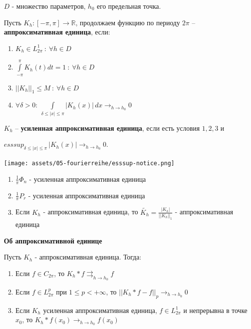 \begin{definition}
    $D$ - множество параметров, $h_0$ его предельная точка.

    Пусть $K_h: [-\pi, \pi] \to \mathbb{R}$, продолжаем функцию по периоду $2\pi$ -- \textbf{аппроксимативная единица}, если:

    \begin{enumerate}
        \item $K_h \in L_{2\pi}^1 \ : \ \forall h \in D$
        \item $\int\limits_{-\pi}^\pi K_h(t) dt = 1 \ : \ \forall h \in D$
        \item $||K_h||_1 \leqslant M \ : \ \forall h \in D$
        \item $\forall \delta > 0 : \ \int\limits_{\delta \leqslant |x| \leqslant \pi} |K_h (x)| \, dx \rightarrow_{h \to h_0} 0$
    \end{enumerate}

    $K_h$ -- \textbf{усиленная аппроксимативная единица}, если есть условия $1, 2, 3$ и
    
    $esssup_{\delta \leqslant |x| \leqslant \pi} \, |K_h (x)| \rightarrow_{h \to h_0} 0$.

    \begin{center}
        \texttt{[image: assets/05-fourierreihe/esssup-notice.png]}
    \end{center}
\end{definition}

\begin{example}
    \begin{enumerate}
        \item $\frac{1}{\pi} \Phi_n$ - усиленная аппроксимативная единица
        \item $\frac{1}{\pi} P_r$ - усиленная аппроксимативная единица
        \item Если $K_h$ - аппроксимативная единица, то $\tilde{K_h} = \frac{|K_h|}{||K_h||_1}$ - аппроксимативная единица
    \end{enumerate}
\end{example}

\begin{theorem}
    \textbf{Об аппроксимативной единице}

    Пусть $K_h$ - аппроксимативная единица. Тогда:

    \begin{enumerate}
        \item Если $f \in C_{2\pi}$, то $K_h * f \rightrightarrows_{h \to h_0} f $
        \item Если $f \in L_{2\pi}^p$ при $1 \leqslant p < +\infty$, то $||K_h * f - f||_p \rightarrow_{h \to h_0} 0 $
        \item Если $K_h$ усиленная аппроксимативная единица, $f \in L_{2\pi}^1$ и непрерывна в точке $x_0$, то $K_h * f (x_0) \rightarrow_{h \to h_0} f(x_0)$
    \end{enumerate}
\end{theorem}


